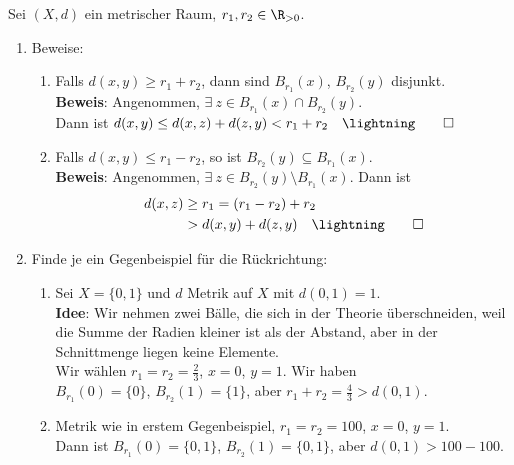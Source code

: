 \begin{problem*}[3]
  Sei \( (X, d) \) ein metrischer Raum, \( r_1, r_2 \in \R_{>0} \).
  \begin{enumerate}
    \item Beweise: 
    \begin{enumerate}
      \item Falls \( d(x, y) \geq r_1 + r_2 \), dann sind \( B_{r_1}(x) \), \( B_{r_2}(y) \) disjunkt. \\
      \textbf{Beweis}: Angenommen, \( \exists \ z \in B_{r_1}(x) \cap B_{r_2}(y) \). \\
      Dann ist \( d(x,y) \leq d(x,z) + d(z,y) < r_1 + r_2 \quad \lightning \qed \) \\
      \item Falls \( d(x,y) \leq r_1-r_2 \), so ist \( B_{r_2}(y) \subseteq B_{r_1}(x) \). \\
      \textbf{Beweis}: Angenommen, \( \exists \ z \in B_{r_2}(y) \setminus B_{r_1}(x) \). Dann ist
      \begin{align*}
        d(x,z) &\geq r_1 = (r_1 - r_2) + r_2 \\
        &> d(x,y) + d(z, y) \quad \lightning \qed
      \end{align*}
    \end{enumerate}
    \item Finde je ein Gegenbeispiel für die Rückrichtung:
    \begin{enumerate}
      \item Sei \( X = \{ 0,1 \} \) und \( d \) Metrik auf \( X \) mit \( d(0,1) = 1 \). \\
      \textbf{Idee}: Wir nehmen zwei Bälle, die sich in der Theorie überschneiden, weil die Summe der Radien kleiner ist als der Abstand, aber in der Schnittmenge liegen keine Elemente. \\
      Wir wählen \( r_1 = r_2 = \frac{2}{3} \), \( x = 0 \), \( y = 1 \). Wir haben \\
      \( B_{r_1}(0) = \{ 0 \} \), \( B_{r_2}(1) = \{ 1 \} \), aber \( r_1 + r_2 = \frac{4}{3} > d(0,1) \). 
      \item Metrik wie in erstem Gegenbeispiel, \( r_1 = r_2 = 100 \), \( x = 0 \), \( y = 1 \). \\
      Dann ist \( B_{r_1}(0) = \{ 0,1 \} \), \( B_{r_2}(1) = \{ 0,1 \} \), aber \( d(0,1) > 100 - 100 \).
    \end{enumerate}
  \end{enumerate}
\end{problem*}

